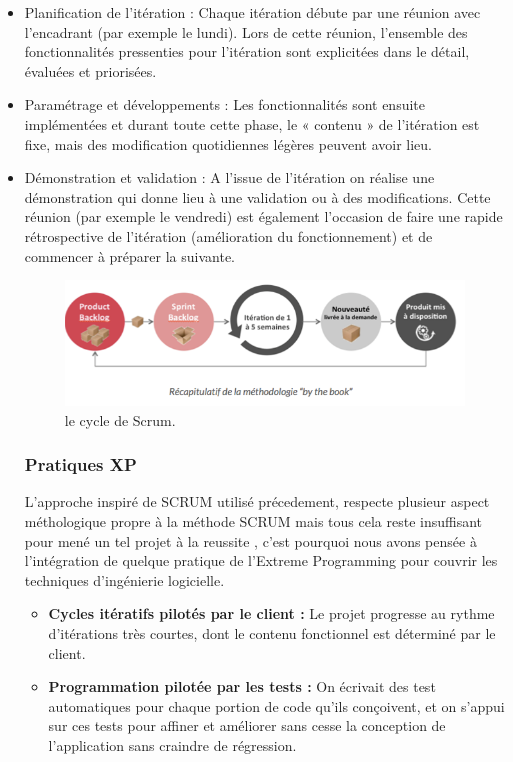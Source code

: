 \documentclass[a4paper, 12pt]{report}
\begin{document}
\begin{itemize}
	
\item Planification de l'itération :
Chaque itération débute par une réunion avec l'encadrant (par exemple le lundi).
Lors de cette réunion, l'ensemble des fonctionnalités pressenties pour l'itération sont explicitées dans le détail, évaluées et priorisées.
\item	 Paramétrage et développements :
Les fonctionnalités sont ensuite implémentées et durant toute cette phase, le « contenu » de l'itération est fixe, mais des modification quotidiennes légères peuvent avoir lieu.
\item	Démonstration et validation :
A l'issue de l'itération on réalise une démonstration qui donne lieu à une validation ou à des modifications.
Cette réunion (par exemple le vendredi) est également l'occasion de faire une rapide rétrospective de l'itération (amélioration du fonctionnement) et de commencer à préparer la suivante.

\begin{figure}[H]
\centering
\includegraphics[scale=1]{Picture1.png}
\caption{le cycle de Scrum.}
\end{figure}
\subsubsection{Pratiques XP}
L'approche inspiré de SCRUM utilisé précedement, respecte plusieur aspect méthologique propre à la méthode SCRUM mais tous cela reste insuffisant pour mené un tel projet à la reussite , c'est pourquoi nous avons pensée à l'intégration de quelque pratique  de l'Extreme Programming  pour couvrir les techniques d'ingénierie logicielle.
\begin{itemize}
	\item 
\textbf{Cycles itératifs pilotés par le client :} Le projet progresse au rythme d'itérations très courtes, dont le contenu fonctionnel est déterminé par le client.
\item \textbf{Programmation pilotée par les tests :} On écrivait des test automatiques pour chaque portion de code qu'ils conçoivent, et on s'appui sur ces tests pour affiner et améliorer sans cesse la conception de l'application sans craindre de régression.
\end{itemize}


\end{itemize}
\end{document}

